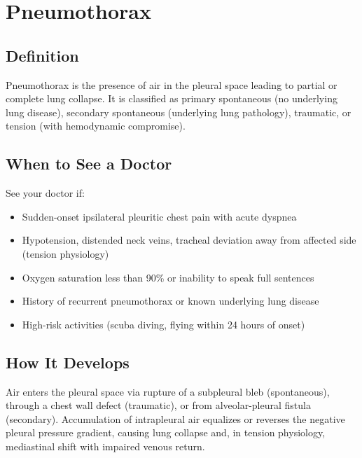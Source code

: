 \chapter{Pneumothorax}

\section*{Definition}
Pneumothorax is the presence of air in the pleural space leading to partial or complete lung collapse. It is classified as primary spontaneous (no underlying lung disease), secondary spontaneous (underlying lung pathology), traumatic, or tension (with hemodynamic compromise).

\section*{When to See a Doctor}
See your doctor if:
\begin{itemize}
  \item Sudden-onset ipsilateral pleuritic chest pain with acute dyspnea
  \item Hypotension, distended neck veins, tracheal deviation away from affected side (tension physiology)
  \item Oxygen saturation less than 90\% or inability to speak full sentences
  \item History of recurrent pneumothorax or known underlying lung disease
  \item High-risk activities (scuba diving, flying within 24 hours of onset)
\end{itemize}

\section*{How It Develops}
Air enters the pleural space via rupture of a subpleural bleb (spontaneous), through a chest wall defect (traumatic), or from alveolar-pleural fistula (secondary). Accumulation of intrapleural air equalizes or reverses the negative pleural pressure gradient, causing lung collapse and, in tension physiology, mediastinal shift with impaired venous return.

